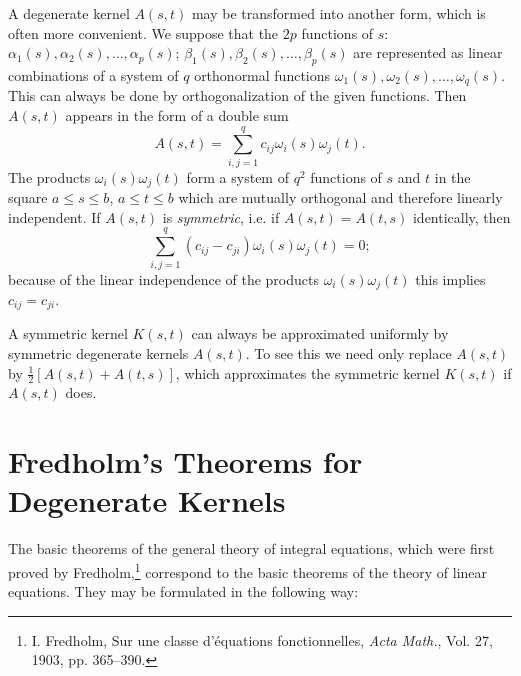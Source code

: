 A degenerate kernel $A(s,t)$ may be transformed into another form, which is often more convenient. We suppose that the $2p$ functions of $s$: $\alpha_1(s),\alpha_2(s),\ldots,\alpha_p(s)$; $\beta_1(s),\beta_2(s),\ldots,\beta_p(s)$ are represented as linear combinations of a system of $q$ orthonormal functions $\omega_1(s),\omega_2(s),\ldots,\omega_q(s)$. This can always be done by orthogonalization of the given functions. Then $A(s,t)$ appears in the form of a double sum
\begin{equation}\tag{4}
A(s,t)=\sum_{i,j=1}^{q}c_{ij}\omega_i(s)\omega_j(t).
\end{equation}
The products $\omega_i(s)\omega_j(t)$ form a system of $q^2$ functions of $s$ and $t$ in the square $a\le s\le b$, $a\le t\le b$ which are mutually orthogonal and therefore linearly independent. If $A(s,t)$ is \emph{symmetric}, i.e. if $A(s,t)=A(t,s)$ identically, then
\[
\sum_{i,j=1}^{q}(c_{ij}-c_{ji})\omega_i(s)\omega_j(t)=0;
\]
because of the linear independence of the products $\omega_i(s)\omega_j(t)$ this implies $c_{ij}=c_{ji}$.

A symmetric kernel $K(s,t)$ can always be approximated uniformly by symmetric degenerate kernels $A(s,t)$. To see this we need only replace $A(s,t)$ by $\tfrac12[A(s,t)+A(t,s)]$, which approximates the symmetric kernel $K(s,t)$ if $A(s,t)$ does.

\section{Fredholm's Theorems for Degenerate Kernels}
The basic theorems of the general theory of integral equations, which were first proved by Fredholm,\footnote{I. Fredholm, Sur une classe d'\'equations fonctionnelles, \emph{Acta Math.}, Vol. 27, 1903, pp. 365--390.} correspond to the basic theorems of the theory of linear equations. They may be formulated in the following way:

